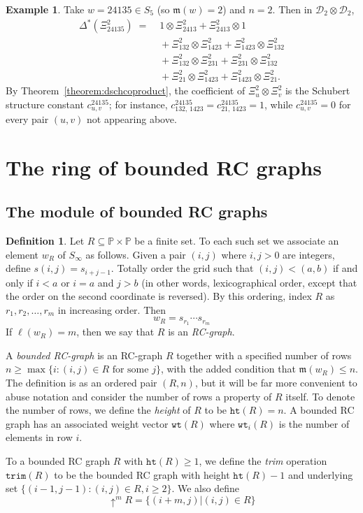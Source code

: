 \documentclass[a4paper,fleqn]{cas-sc}
\theoremstyle{definition}
\newtheorem{definition}[lemma]{Definition}
\newtheorem{example}[lemma]{Example}
\theoremstyle{remark}
\numberwithin{equation}{subsection}
\newcommand{\shup}{{\uparrow}}
\newcommand{\wof}[1]{w_{#1}}
\newcommand{\wtt}{\mathtt{wt}}
\newcommand{\trm}{\mathtt{trim}}
\newcommand{\hr}{\mathtt{ht}}
\newcommand{\dsch}{\ensuremath{\Xi}}
\newcommand{\dcoma}{\mathcal{D}}
\newcommand{\maxd}{\mathfrak{m}}
\begin{document}
\begin{example}\label{example:dschcoproduct}
Take $w=24135\in S_5$ (so $\maxd(w)=2$) and $n=2$. Then in $\dcoma_2\otimes\dcoma_2$,
\begin{align*}
\Delta^*(\dsch_{24135}^2) \;=\;& 1\otimes \dsch_{2413}^2 + \dsch_{2413}^2\otimes 1\\
&{}+ \dsch_{132}^2\otimes \dsch_{1423}^2 + \dsch_{1423}^2\otimes \dsch_{132}^2\\
&{}+ \dsch_{132}^2\otimes \dsch_{231}^2 + \dsch_{231}^2\otimes \dsch_{132}^2\\
&{}+ \dsch_{21}^2\otimes \dsch_{1423}^2 + \dsch_{1423}^2\otimes \dsch_{21}^2.
\end{align*}
By Theorem~\ref{theorem:dschcoproduct}, the coefficient of $\dsch_u^2\otimes\dsch_v^2$ is the Schubert structure constant $c_{u,v}^{24135}$; for instance, $c_{132,\,1423}^{24135} = c_{21,\,1423}^{24135} = 1$, while $c_{u,v}^{24135}=0$ for every pair $(u,v)$ not appearing above.
\end{example}


\section{The ring of bounded RC graphs}\label{section:brc}

\subsection{The module of bounded RC graphs}

\begin{definition}\label{definition:rcgraph}
	Let $R\subseteq \mathbb{P}\times \mathbb{P}$ be a finite set. To each such set we associate an element $\wof{R}$ of $S_\infty$ as follows. Given a pair $(i, j)$ where $i,j>0$ are integers, define $s(i,j) = s_{i+j - 1}$. Totally order the grid such that $(i, j) < (a, b)$ if and only if $i < a$ or $i = a$ and $j > b$ (in other words, lexicographical order, except that the order on the second coordinate is reversed). By this ordering, index $R$ as $r_1, r_2,\ldots, r_m$ in increasing order. Then
	$$\wof{R} = s_{r_1}\cdots s_{r_m}$$
	If $\ell(\wof{R}) = m$, then we say that $R$ is an \emph{RC-graph}.
	
	A \emph{bounded RC-graph} is an RC-graph $R$ together with a specified number of rows $n\geq \max\{i: (i,j)\in R\text{ for some }j\}$, with the added condition that $\maxd(\wof{R})\leq n$. The definition is as an ordered pair $(R, n)$, but it will be far more convenient to abuse notation and consider the number of rows a property of $R$ itself. To denote the number of rows, we define the \emph{height} of $R$ to be $\hr(R)=n$. A bounded RC graph has an associated weight vector $\wtt(R)$ where $\wtt_i(R)$ is the number of elements in row $i$.

  
	
	To a bounded RC graph $R$ with $\hr(R)\geq 1$, we define the \emph{trim} operation $\trm(R)$ to be the bounded RC graph with height $\hr(R)-1$ and underlying set $\{(i-1, j-1): (i,j)\in R, i\geq 2\}$. We also define
	$$\shup^m R=\{(i+m, j)| (i,j)\in R\}$$
\end{definition}
\end{document}
